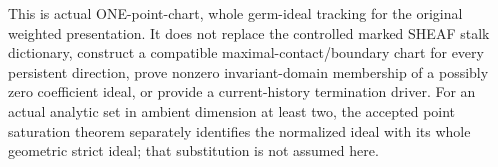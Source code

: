 This is actual ONE-point-chart, whole germ-ideal tracking for the original
weighted presentation. It does not replace the controlled marked SHEAF stalk
dictionary, construct a compatible maximal-contact/boundary chart for every
persistent direction, prove nonzero invariant-domain membership of a possibly
zero coefficient ideal, or provide a current-history termination driver.
For an actual analytic set in ambient dimension at least two, the accepted
point saturation theorem separately identifies the normalized ideal with its
whole geometric strict ideal; that substitution is not assumed here.
